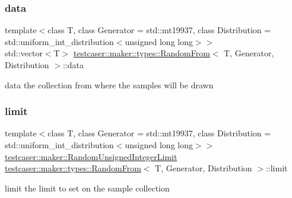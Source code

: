 \subsubsection{\texorpdfstring{data}{data}}
{\footnotesize\ttfamily template$<$class T, class Generator = std\+::mt19937, class Distribution = std\+::uniform\+\_\+int\+\_\+distribution$<$unsigned long long$>$$>$ \\
std\+::vector$<$T$>$ \mbox{\hyperlink{structtestcaser_1_1maker_1_1types_1_1RandomFrom}{testcaser\+::maker\+::types\+::\+Random\+From}}$<$ T, Generator, Distribution $>$\+::data}



data the collection from where the samples will be drawn 

\mbox{\label{structtestcaser_1_1maker_1_1types_1_1RandomFrom_a4701553931d6eafed7f3070fa64924b7}} 
\subsubsection{\texorpdfstring{limit}{limit}}
{\footnotesize\ttfamily template$<$class T, class Generator = std\+::mt19937, class Distribution = std\+::uniform\+\_\+int\+\_\+distribution$<$unsigned long long$>$$>$ \\
\mbox{\hyperlink{classtestcaser_1_1maker_1_1RandomUnsignedIntegerLimit}{testcaser\+::maker\+::\+Random\+Unsigned\+Integer\+Limit}} \mbox{\hyperlink{structtestcaser_1_1maker_1_1types_1_1RandomFrom}{testcaser\+::maker\+::types\+::\+Random\+From}}$<$ T, Generator, Distribution $>$\+::limit}



limit the limit to set on the sample collection 

\mbox{\label{structtestcaser_1_1maker_1_1types_1_1RandomFrom_aaf9cc06f481c378f107637153a6e5f15}} 
